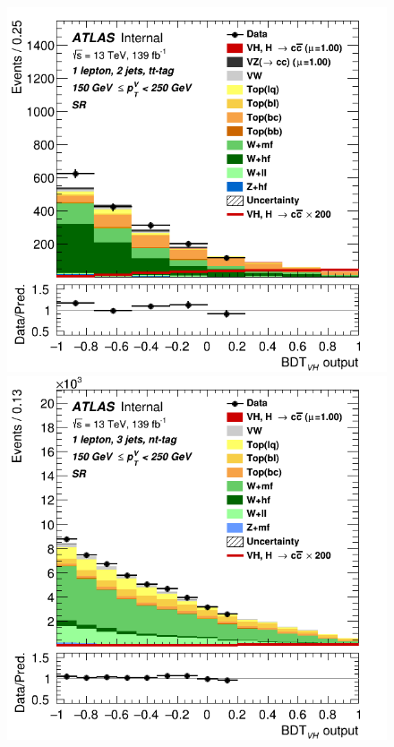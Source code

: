 \begin{figure}[h!]
\includegraphics[scale=0.2753]{Images/VH/SRsandTopCRs/Region_distmva_DSR_BMax250_L1_Y6051_TTypett_T2_J2_BMin150_Prefit.png}\\
\includegraphics[scale=0.2753]{Images/VH/SRsandTopCRs/Region_distmva_DSR_BMax250_L1_Y6051_TTypent_T1_J3_BMin150_Prefit.png}

\end{figure}
